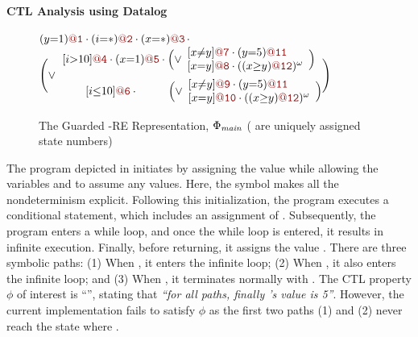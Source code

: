 \paragraph*{\textbf{CTL Analysis using Datalog}}
\label{sec:example:mixed_abstract_domain}




{\begin{figure*}
\qquad\qquad\qquad 
$(y{=}1)\loc{@1} \cdot (i{=}*)\loc{@2} \cdot (x{=}*)\loc{@3}\, \cdot $ 
$\Biggl(\vee\begin{matrix}
[i{>}10]\loc{@4} \cdot (x{=}1)\loc{@5} 
\cdot
\begin{matrix}
\Bigl(\vee 
\begin{array}{l}
[x{\not=}y]\loc{@7}  \cdot (y{=}5)\loc{@11}
\\[0em]
[x{=}y]\loc{@8} \cdot ((x{\geq}y)\loc{@12})^\omega
\end{array}
\Bigr)
\end{matrix}
\\[1em]
\qquad\ \  
[i{\leq}10]\loc{@6}
\cdot \qquad \ \  
\begin{matrix}
\Bigl(\vee 
\begin{array}{l}
[x{\not=}y]\loc{@9}  \cdot (y{=}5)\loc{@11}
\\[0em]
[x{=}y]\loc{@10} \cdot ((x{\geq}y)\loc{@12})^\omega
\end{array}
\Bigr)
\end{matrix}
\end{matrix}\Biggr)$
\caption{The Guarded \code{\omega}-RE Representation, $\Phi_{\mathit{main}}$  ( are uniquely assigned state numbers)}
\label{fig:omegaRE_first_Example}
\vspace{-1mm}
\end{figure*}}




The program depicted in  initiates by assigning the value  while allowing the variables  and  to assume any values. Here, the symbol \code{*} makes all the nondeterminism explicit. Following this initialization, the program executes a conditional statement, which includes an assignment of . Subsequently, the program enters a while loop, and once the while loop is entered, it results in infinite execution. Finally, before returning, it assigns the value . 
There are three symbolic paths: (1) When , it enters the infinite loop; (2) When , it also enters the infinite loop; and (3) When , it terminates normally with .  
The CTL property $\phi$ of interest is ``\code{AF(y{=}5)}'', stating that \emph{``for all paths, finally \code{y}'s value is 5''}. However, the current implementation fails to satisfy $\phi$ as the first two paths (1) and (2) never reach the state where \code{y{=}5}. 




